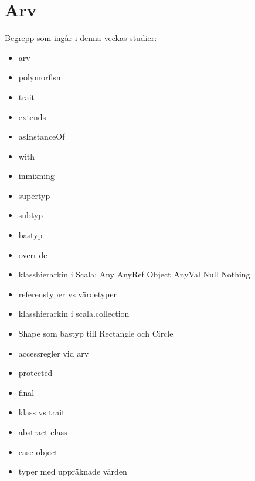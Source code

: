 \chapter{Arv}\label{chapter:W07}
Begrepp som ingår i denna veckas studier:
\begin{itemize}[noitemsep,label={$\square$},leftmargin=*]
\item arv
\item polymorfism
\item trait
\item extends
\item asInstanceOf
\item with
\item inmixning
\item supertyp
\item subtyp
\item bastyp
\item override
\item klasshierarkin i Scala: Any AnyRef Object AnyVal Null Nothing
\item referenstyper vs värdetyper
\item klasshierarkin i scala.collection
\item Shape som bastyp till Rectangle och Circle
\item accessregler vid arv
\item protected
\item final
\item klass vs trait
\item abstract class
\item case-object
\item typer med uppräknade värden\end{itemize}
